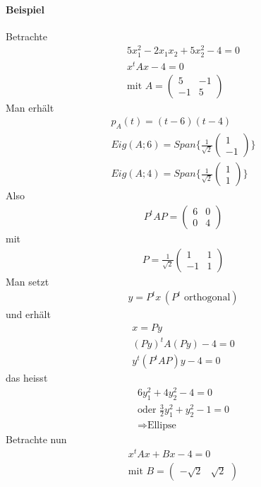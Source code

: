 \paragraph{Beispiel}
Betrachte
\begin{align}
5x_{1}^{2} - 2x_1 x_2 + 5 x_{2}^{2} - 4 = 0 \\
x^t Ax -4 = 0 \\
\text{mit } A = \begin{pmatrix} 5 & -1 \\ -1 & 5 \end{pmatrix}
\end{align}
Man erhält
\begin{align}
p_A(t) = (t-6)(t-4) \\
Eig(A; 6) = Span\{\frac{1}{\sqrt{2}} \begin{pmatrix} 1 \\ -1 \end{pmatrix}\} \\
Eig(A; 4) = Span\{\frac{1}{\sqrt{2}} \begin{pmatrix} 1 \\ 1 \end{pmatrix}\}
\end{align}
Also
\begin{align}
P^t AP = \begin{pmatrix} 6 & 0 \\ 0 & 4 \end{pmatrix}
\end{align}
mit
\begin{align}
P = \frac{1}{\sqrt{2}} \begin{pmatrix} 1 & 1 \\ -1 & 1 \end{pmatrix}
\end{align}
Man setzt
\begin{align}
y = P^t x\, (P^t \text{ orthogonal})
\end{align}
und erhält
\begin{align}
x = Py \\
(Py)^t A (Py) -4 = 0 \\
y^t (P^t AP)y -4 = 0
\end{align}
das heisst
\begin{align}
6y_{1}^{2} + 4 y_{2}^{2} -4 = 0 \\
\text{oder } \frac{3}{2} y_{1}^{2} + y_{2}^{2} -1 = 0 \\
\Rightarrow \text{Ellipse}
\end{align}
Betrachte nun
\begin{align}
x^t Ax + Bx -4 = 0 \\
\text{mit } B = \begin{pmatrix} -\sqrt{2} & \sqrt{2} \end{pmatrix}
\end{align}
